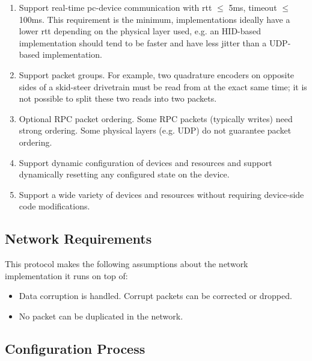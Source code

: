 \documentclass{article}
\begin{document}
\begin{enumerate}
    \item Support real-time \gls{pc}-\gls{device} communication with \gls{rtt} $\leq$ 5ms, timeout
    $\leq$ 100ms. This requirement is the minimum, implementations ideally have a lower \gls{rtt}
    depending on the physical layer used, e.g. an HID-based implementation should tend to be faster
    and have less jitter than a UDP-based implementation.

    \item Support packet \glspl{group}. For example, two quadrature encoders on opposite sides of a
    skid-steer drivetrain must be read from at the exact same time; it is not possible to split
    these two reads into two packets.

    \item Optional RPC packet ordering. Some RPC packets (typically writes) need strong ordering.
    Some physical layers (e.g. UDP) do not guarantee packet ordering.

    \item Support dynamic configuration of \glspl{device} and \glspl{resource} and support
    dynamically resetting any configured state on the \gls{device}.

    \item Support a wide variety of \glspl{device} and \glspl{resource} without requiring
    \gls{device}-side code modifications.
\end{enumerate}

\subsection{Network Requirements}

This protocol makes the following assumptions about the network implementation it runs on top of:
\begin{itemize}
    \item Data corruption is handled. Corrupt packets can be corrected or dropped.

    \item No packet can be duplicated in the network.
\end{itemize}

\subsection{Configuration Process}
\end{document}
